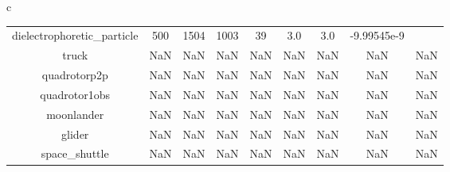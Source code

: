 \documentclass{standalone}
\begin{document}
\begin{tabular}{c}
\begin{tabular}{ccccccccc}
  dielectrophoretic\_particle & 500 & 1504 & 1003 & 39 & 3.0 & 3.0 & -9.99545e-9 & \color{red}{Infeasible Problem} \\
  truck & NaN & NaN & NaN & NaN & NaN & NaN & NaN & NaN \\
  quadrotorp2p & NaN & NaN & NaN & NaN & NaN & NaN & NaN & NaN \\
  quadrotor1obs & NaN & NaN & NaN & NaN & NaN & NaN & NaN & NaN \\
  moonlander & NaN & NaN & NaN & NaN & NaN & NaN & NaN & NaN \\
  glider & NaN & NaN & NaN & NaN & NaN & NaN & NaN & NaN \\
  space\_shuttle & NaN & NaN & NaN & NaN & NaN & NaN & NaN & NaN \\\hline
\end{tabular}
\end{tabular}
\end{document}
